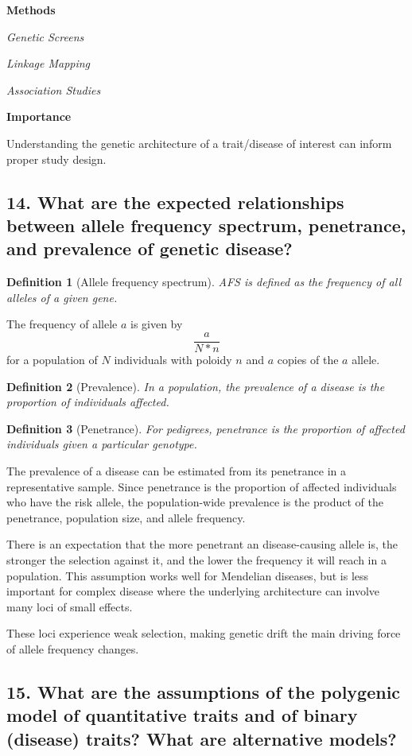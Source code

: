 \documentclass{tufte-handout}
\theoremstyle{noparens}
\newtheorem*{define}{Definition}
\begin{document}
\textbf{Methods}

\emph{Genetic Screens}

\emph{Linkage Mapping}

\emph{Association Studies}

\noindent
\textbf{Importance}

Understanding the genetic architecture of a trait/disease of interest can inform proper study design.  
\newpage
\subsection{14. What are the expected relationships between allele frequency spectrum, penetrance, and prevalence of genetic disease?}

\begin{define}[Allele frequency spectrum]
AFS is defined as the frequency of all alleles of a given gene.
\end{define}

The frequency of allele $a$ is given by \[\frac{a}{N*n} \] for a population of $N$ individuals with poloidy $n$ and $a$ copies of the $a$ allele.

\begin{define}[Prevalence]
In a population, the prevalence of a disease is the proportion of individuals affected.
\end{define}

\begin{define}[Penetrance]
For pedigrees, penetrance is the proportion of affected individuals given a particular genotype.
\end{define}

The prevalence of a disease can be estimated from its penetrance in a representative sample. Since penetrance is the proportion of affected individuals who have the risk allele, the population-wide prevalence is the product of the penetrance, population size, and allele frequency.

There is an expectation that the more penetrant an disease-causing allele is, the stronger the selection against it, and the lower the frequency it will reach in a population. This assumption works well for Mendelian diseases, but is less important for complex disease where the underlying architecture can involve many loci of small effects. 

These loci experience weak selection, making genetic drift the main driving force of allele frequency changes. 

\newpage
\subsection{15. What are the assumptions of the polygenic model of quantitative traits and of binary (disease) traits? What are alternative models?}
\end{document}
